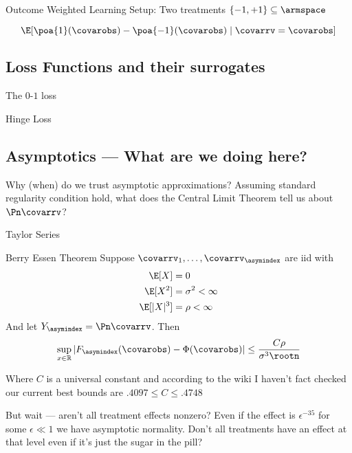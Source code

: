 \begin{frame}{Outcome Weighted Learning}
	Setup: Two treatments $\{-1, +1\} \subseteq \armspace$

	$$\E[\poa{1}(\covarobs) - \poa{-1}(\covarobs) \mid \covarrv = \covarobs]$$

\end{frame}

\begin{frame}{}
\end{frame}


\subsection{Loss Functions and their surrogates}
\begin{frame}{The $0$-$1$ loss}
\end{frame}

\begin{frame}{Hinge Loss}
\end{frame}
\subsection{Asymptotics --- What are we doing here?}
\begin{frame}{Why (when) do we trust asymptotic approximations?}
	Assuming standard regularity condition hold, what does the Central Limit
	Theorem tell us about $\Pn \covarrv$?

	Taylor Series
\end{frame}

\begin{frame}{Berry Essen Theorem}
	Suppose $\covarrv_1, \ldots, \covarrv_{\asymindex}$ are iid with
	\begin{align*}
		\E[X]     & = 0                 \\
		\E[X^2]   & = \sigma^2 < \infty \\
		\E[|X|^3] & = \rho < \infty
	\end{align*}
	And let $Y_{\asymindex} = \Pn \covarrv$. Then
	\vfill
	\begin{equation}
		\sup_{x \in \mathbb{R}}|F_{\asymindex}(\covarobs) - \Phi(\covarobs)| \leq \frac{C
			\rho}{\sigma^{3} \rootn }
	\end{equation}

	Where $C$ is a universal constant and according to the wiki I haven't fact
	checked our current best bounds are $.4097 \leq C \leq .4748$
	\vfill
\end{frame}

\begin{frame}{But wait --- aren't all treatment effects nonzero?}
	Even if the effect is $\epsilon^{-35}$ for some $\epsilon \ll 1$ we have asymptotic
	normality. Don't all treatments have an  effect at that level even if it's
	just the sugar in the pill?
\end{frame}



